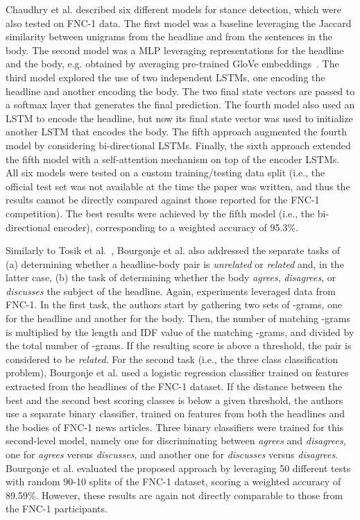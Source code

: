 Chaudhry et al. \cite{stanfordstance} described six different models for stance detection, which were also tested on FNC-1 data. The first model was a baseline leveraging the Jaccard similarity between unigrams from the headline and from the sentences in the body. The second model was a MLP leveraging representations for the headline and the body, e.g. obtained by averaging pre-trained GloVe embeddings~\cite{glove}. The third model explored the use of two independent LSTMs, one encoding the headline and another encoding the body. The two final state vectors are passed to a softmax layer that generates the final prediction. The fourth model also used an LSTM to encode the headline, but now its final state vector was used to initialize another LSTM that encodes the body. The fifth approach augmented the fourth model by considering bi-directional LSTMs. Finally, the sixth approach extended the fifth model with a self-attention mechanism on top of the encoder LSTMs. All six models were tested on a custom training/testing data split (i.e., the official test set was not available at the time the paper was written, and thus the results cannot be directly compared against those reported for the FNC-1 competition). The best results were achieved by the fifth model (i.e., the bi-directional encoder), corresponding to a weighted accuracy of 95.3\%.

Similarly to Tosik et al.~\cite{tosikdebunking}, 
Bourgonje et al. \cite{clickbait} also addressed the separate tasks of (a) determining whether a headline-body pair is \textit{unrelated} or \textit{related} and, in the latter case, (b) the task of determining whether the body \textit{agrees}, \textit{disagrees}, or \textit{discusses} the subject of the headline. Again, experiments leveraged data from FNC-1. In the first task, the authors start by gathering two sets of -grams, one for the headline and another for the body. Then, the number of matching -grams is multiplied by the length and IDF value of the matching -grams, and divided by the total number of -grams. If the resulting score is above a threshold, the pair is considered to be \textit{related}. For the second task (i.e., the three class classification problem), Bourgonje et al. used a logistic regression classifier trained on features extracted from the headlines of the FNC-1 dataset. If the distance between the best and the second best scoring classes is below a given threshold, the authors use a separate binary classifier, trained on features from both the headlines and the bodies of FNC-1 news articles. Three binary classifiers were trained for this second-level model, namely one for discriminating between \textit{agrees} and \textit{disagrees}, one for \textit{agrees} versus \textit{discusses}, and another one for \textit{discusses} versus \textit{disagrees}. Bourgonje et al. evaluated the proposed approach by leveraging 50 different tests with random 90-10 splits of the FNC-1 dataset, scoring a weighted accuracy of 89.59\%. However, these results are again not directly comparable to those from the FNC-1 participants.

